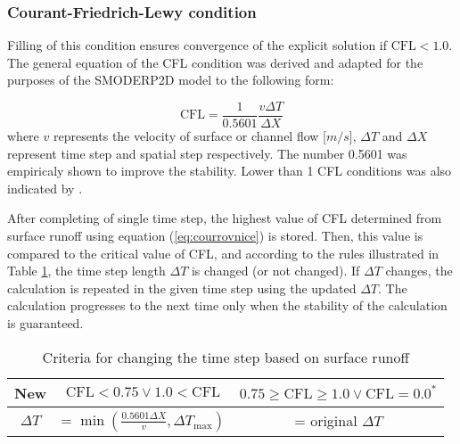     \subsubsection{Courant-Friedrich-Lewy condition}
    Filling of this condition ensures convergence of the explicit solution if
    $\text{CFL} < 1.0$. The general equation of the CFL condition was derived
    and adapted for the purposes of the SMODERP2D model to the following form:

    \begin{equation}
        \text{CFL} = \frac{1}{0.5601}\frac{v \Delta T}{\Delta X}
        \label{eq:courrovnice}
    \end{equation} where $v$ represents the velocity of surface or channel flow
    [$m/s$], $\Delta T$ and $\Delta X$ represent time step and spatial step
    respectively. The number 0.5601 was empiricaly shown to improve the
    stability. Lower than 1 CFL conditions was also indicated by
    \cite{zhang1989modeling, esteves2000overland}.

    After completing of single time step, the highest value of CFL determined
    from surface runoff using equation (\ref{eq:courrovnice}) is stored. Then,
    this value is compared to the critical value of CFL, and according to the
    rules illustrated in Table \ref{tab:cflsheet}, the time step length $\Delta
    T$ is changed (or not changed). If $\Delta T$ changes, the calculation is
    repeated in the given time step using the updated $\Delta T$. The
    calculation progresses to the next time only when the stability of the
    calculation is guaranteed.

    \begin{table}[t!]
        \centering
        \caption{Criteria for changing the time step based on surface runoff}
        \label{tab:cflsheet}
        \begin{tabular}{ccc}
            \hline
            New &  $\text{CFL} < 0.75 \lor 1.0 < \text{CFL}$ & $ 0.75 \geq \text{CFL} \geq 1.0 \lor \text{CFL} = 0.0^*$ \\
            \hline
            \hline
            $\Delta T$ &  = $\min\left(\frac{0.5601 \Delta X}{v}, \Delta T_{\text{max}}\right)$ & = original $\Delta T$\\
            \hline
        \end{tabular}
    \end{table}


